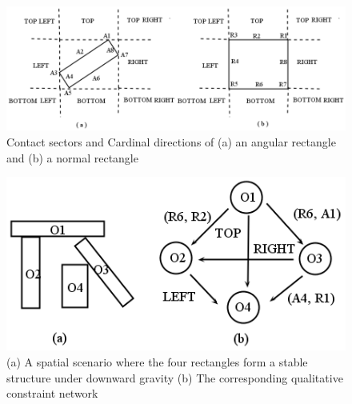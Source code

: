 \documentclass[letterpaper]{article}
\begin{document}
\begin{figure}[t]
\centering\includegraphics[scale=0.25]{EGSR-relations.png}
\vspace{-3mm}
\caption{Contact sectors and Cardinal directions of (a) an angular rectangle and (b) a normal rectangle}
\label{EGSR}
\vspace{-3mm}
\end{figure}

 \begin{figure}[t]
\centering\includegraphics[scale=0.35]{QCN.png}\vspace{-3mm}\caption{(a) A spatial scenario where the four rectangles form a stable structure under downward gravity (b) The corresponding qualitative constraint network}
\label{QCN}
\vspace{-6mm}
\end{figure}
\vspace{-2mm}
\end{document}

